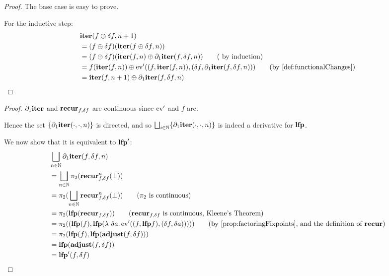 \iterDerivativesF*
\begin{proof}
  \label{prf:iterDerivativesF}
  The base case is easy to prove.

  For the inductive step:
  \begin{align*}
    &\iter(f \cplus \change{f}, n + 1)\\
    &=(f \cplus \change{f})(\iter(f \cplus \change{f}, n))\\
    &= (f \cplus \change{f})(
        \iter(f, n)
        \cplus \partial_1{\iter}(f, \change{f}, n)
      )
    \tag{ by induction}\\
    &= f(\iter(f, n)) \cplus \derive{\ev}((f, \iter(f, n)), (\change{f},
      \partial_1{\iter}(f, \change{f}, n)))
    \tag{by \cref{def:functionalChanges}}\\
    & =\iter(f, n + 1) \cplus \partial_1{\iter}(f, \change{f}, n)
  \end{align*}
\end{proof}

\leastFixpointDerivatives*
\begin{proof}
  \label{prf:leastFixpointDerivatives}
  $\partial_1{\mathbf{iter}}$ and $\mathbf{recur}_{f, \delta f}$ are continuous since
  $\operatorname{ev}'$ and $f$ are.

  Hence the set $\{ \partial_1{\mathbf{iter}}(\cdot, \cdot, n) \}$ is directed, and so $\bigsqcup_{i \in \mathbb{N}}
  \{ \partial_1{\mathbf{iter}}(\cdot, \cdot, n) \}$ is indeed a derivative for $\mathbf{lfp}$.

  We now show that it is equivalent to $\mathbf{lfp}'$:
  \begin{align*}
    &\bigsqcup_{n \in \NN} \partial_1{\iter}(f, \change{f}, n)\\
    &=\bigsqcup_{n \in \NN} \pi_2(\nextiter_{f, \change{f}}^n(\bot))\\
    &=\pi_2(\bigsqcup_{n \in \NN} \nextiter_{f, \change{f}}^n(\bot)) \tag{$\pi_2$ is continuous}\\
    &= \pi_2 (\lfp(\nextiter_{f, \change{f}})) \tag{$\nextiter_{f, \change{f}}$ is continuous, Kleene's Theorem}\\
    &= \pi_2 ((\lfp(f), \lfp (\lambda\ \change{a}. \derive{\ev}((f, \lfp f), (\change{f}, \change{a})))))
    \tag{by \cref{prop:factoringFixpoints}, and the definition of $\nextiter$}\\
    &= \pi_2 (\lfp(f), \lfp(\adjust(f, \change{f})))\\
    &= \lfp(\adjust(f, \change{f}))\\
    &= \derive{\lfp}(f, \change{f})
  \end{align*}
\end{proof}

